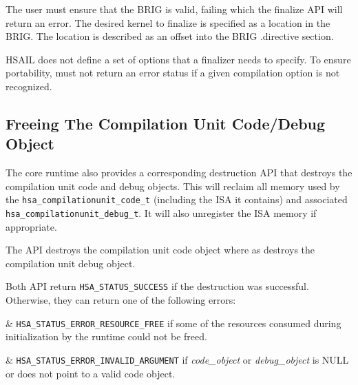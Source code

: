 


The user must ensure that the B\-R\-I\-G is valid, failing which the
finalize API will return an error.  The desired kernel to finalize
is specified as a location in the B\-R\-I\-G. The location is
described as an offset into the B\-R\-I\-G .directive section.

H\-S\-A\-I\-L does not define a set of options that a finalizer
needs to specify. To ensure portability, 
must not return an error status if a given compilation option is not
recognized.

\subsection{Freeing The Compilation Unit Code/Debug Object}

The core runtime also provides a corresponding destruction API that
destroys the compilation unit code and debug objects.  This will
reclaim all memory used by the
\texttt{hsa\_compilationunit\_code\_t} (including the ISA it
contains) and associated \texttt{hsa\_compilationunit\_debug\_t}. It
will also unregister the ISA memory if appropriate.



The  API destroys the
compilation unit code object where as
 destroys the compilation
unit debug object.

Both API return \texttt{HSA\_STATUS\_SUCCESS} if the destruction was
successful. Otherwise, they can return one of the following errors:

\begin{easylist}

& \texttt{HSA\_STATUS\_ERROR\_RESOURCE\_FREE} if some of the
resources consumed during initialization by the runtime could not be
freed.

& \texttt{HSA\_STATUS\_ERROR\_INVALID\_ARGUMENT} if {\itshape
code\_object} or {\itshape debug\_object} is NULL or does not point
to a valid code object.

\end{easylist}

